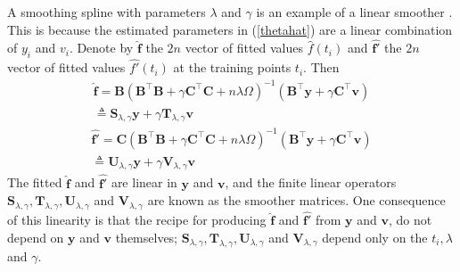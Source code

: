 A smoothing spline with parameters $\lambda$ and $\gamma$ is an example of a linear smoother \cite{esl2009}. This is because the estimated parameters in (\ref{thetahat}) are a linear combination of $y_i$ and $v_i$. Denote by $\hat{\mathbf{f}}$ the $2n$ vector of fitted values $\hat{f}(t_i)$ and $\hat{\mathbf{f}'}$ the $2n$ vector of fitted values $\hat{f'}(t_i)$ at the training points $t_i$. Then
\begin{equation}
\begin{split}
\hat{\mathbf{f}} =\mathbf{B}(\mathbf{B}^\top\mathbf{B}+\gamma\mathbf{C}^\top\mathbf{C}+n\lambda\Omega)^{-1}(\mathbf{B}^\top\mathbf{y}+\gamma\mathbf{C}^\top\mathbf{v})\\
\triangleq \mathbf{S}_{\lambda,\gamma}\mathbf{y}+\gamma\mathbf{T}_{\lambda,\gamma}\mathbf{v} 
\end{split}
\end{equation}
\begin{equation}
\begin{split}
\hat{\mathbf{f}'}
=\mathbf{C}(\mathbf{B}^\top\mathbf{B}+\gamma\mathbf{C}^\top\mathbf{C}+n\lambda\Omega)^{-1}(\mathbf{B}^\top\mathbf{y}+\gamma\mathbf{C}^\top\mathbf{v})\\
\triangleq\mathbf{U}_{\lambda,\gamma}\mathbf{y}+\gamma\mathbf{V}_{\lambda,\gamma}\mathbf{v}
\end{split}
\end{equation}
The fitted $\hat{\mathbf{f}}$ and $\hat{\mathbf{f}'}$ are linear in $\mathbf{y}$ and $\mathbf{v}$, and the finite linear operators $\mathbf{S}_{\lambda,\gamma}, \mathbf{T}_{\lambda,\gamma}, \mathbf{U}_{\lambda,\gamma}$ and $\mathbf{V}_{\lambda,\gamma}$ are known as the smoother matrices. One consequence of this linearity is that the recipe for producing $\hat{\mathbf{f}}$ and $\hat{\mathbf{f}'}$ from $\mathbf{y}$ and $\mathbf{v}$, do not depend on $\mathbf{y}$ and $\mathbf{v}$ themselves; $\mathbf{S}_{\lambda,\gamma}, \mathbf{T}_{\lambda,\gamma}, \mathbf{U}_{\lambda,\gamma}$ and $\mathbf{V}_{\lambda,\gamma}$ depend only on the $t_i,\lambda$ and $\gamma$.


